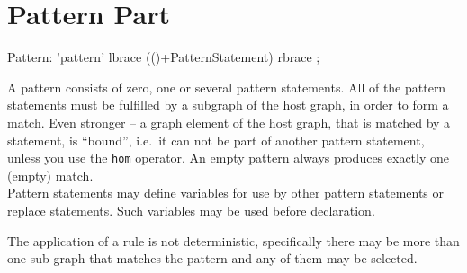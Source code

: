 \section{Pattern Part}
\label{patternpart}
\begin{rail}
  Pattern: 'pattern' lbrace (()+PatternStatement) rbrace ;
\end{rail}
A pattern consists of zero, one or several pattern statements. All of the pattern statements must be fulfilled by a subgraph of the host graph, in order to form a match. Even stronger -- a graph element of the host graph, that is matched by a statement, is ``bound'', i.e.\ it can not be part of another pattern statement, unless you use the \texttt{hom} operator. An empty pattern always produces exactly one (empty) match.\\
Pattern statements may define variables for use by other pattern statements or replace statements. Such variables may be used before declaration.
\begin{note}
The application of a rule is not deterministic, specifically there may be more than one sub graph that matches the pattern and any of them may be selected.
\end{note}


